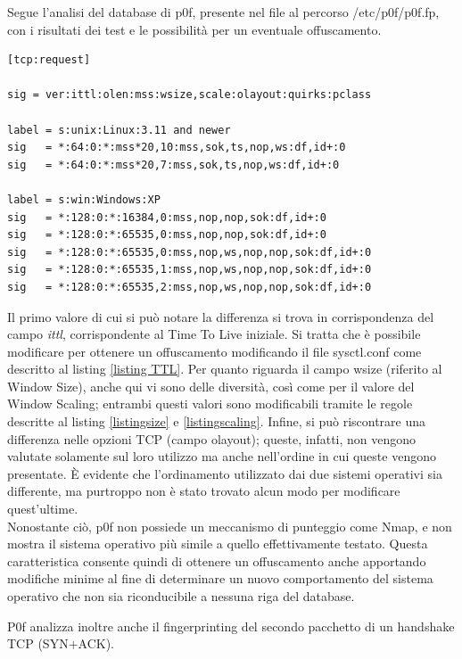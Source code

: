 Segue l'analisi del database di p0f, presente nel file al percorso /etc/p0f/p0f.fp, con i risultati dei test e le possibilità per un eventuale offuscamento.
\begin{lstlisting}[caption={Fingerptinting TCP con p0f}]
[tcp:request]

sig = ver:ittl:olen:mss:wsize,scale:olayout:quirks:pclass

label = s:unix:Linux:3.11 and newer
sig   = *:64:0:*:mss*20,10:mss,sok,ts,nop,ws:df,id+:0
sig   = *:64:0:*:mss*20,7:mss,sok,ts,nop,ws:df,id+:0

label = s:win:Windows:XP
sig   = *:128:0:*:16384,0:mss,nop,nop,sok:df,id+:0
sig   = *:128:0:*:65535,0:mss,nop,nop,sok:df,id+:0
sig   = *:128:0:*:65535,0:mss,nop,ws,nop,nop,sok:df,id+:0
sig   = *:128:0:*:65535,1:mss,nop,ws,nop,nop,sok:df,id+:0
sig   = *:128:0:*:65535,2:mss,nop,ws,nop,nop,sok:df,id+:0
\end{lstlisting}

Il primo valore di cui si può notare la differenza si trova in corrispondenza del campo \textit{ittl}, corrispondente al Time To Live iniziale.
Si tratta che è possibile modificare per ottenere un offuscamento modificando il file sysctl.conf come descritto al listing \ref{listing TTL}.
Per quanto riguarda il campo wsize (riferito al Window Size), anche qui vi sono delle diversità, così come per il valore del Window Scaling; entrambi questi valori sono modificabili tramite le regole descritte al listing \ref{listingsize} e \ref{listingscaling}.
Infine, si può riscontrare una differenza nelle opzioni TCP (campo olayout); queste, infatti, non vengono valutate solamente sul loro utilizzo ma anche nell'ordine in cui queste vengono presentate. È evidente che l'ordinamento utilizzato dai due sistemi operativi sia differente, ma purtroppo non è stato trovato alcun modo per modificare quest'ultime.\\
Nonostante ciò, p0f non possiede un meccanismo di punteggio come Nmap, e non mostra il sistema operativo più simile a quello effettivamente testato. Questa caratteristica consente quindi di ottenere un offuscamento anche apportando modifiche minime al fine di determinare un nuovo comportamento del sistema operativo che non sia riconducibile a nessuna riga del database.

P0f analizza inoltre anche il fingerprinting del secondo pacchetto di un handshake TCP (SYN+ACK).

